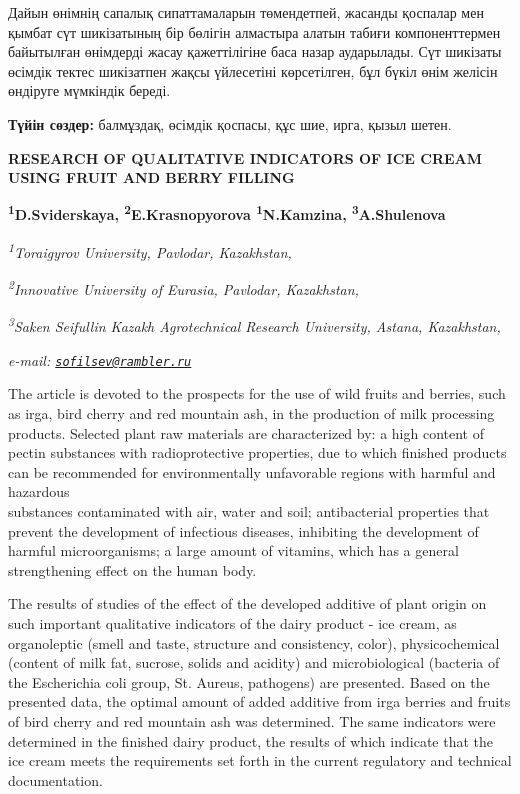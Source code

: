 Дайын өнімнің сапалық сипаттамаларын төмендетпей, жасанды қоспалар мен
қымбат сүт шикізатының бір бөлігін алмастыра алатын табиғи
компоненттермен байытылған өнімдерді жасау қажеттілігіне баса назар
аударылады. Сүт шикізаты өсімдік тектес шикізатпен жақсы үйлесетіні
көрсетілген, бұл бүкіл өнім желісін өндіруге мүмкіндік береді.

{\bfseries Түйін сөздер:} балмұздақ, өсімдік қоспасы, құс шие, ирга, қызыл
шетен.

\begin{articleheader}
{\bfseries RESEARCH OF QUALITATIVE INDICATORS OF ICE CREAM USING FRUIT AND BERRY FILLING}

{\bfseries
\textsuperscript{1}D.Sviderskaya\textsuperscript{\envelope },
\textsuperscript{2}E.Krasnopyorova
\textsuperscript{1}N.Kamzina,
\textsuperscript{3}A.Shulenova}
\end{articleheader}

\begin{affiliation}
\emph{\textsuperscript{1}Toraigyrov University, Pavlodar, Kazakhstan,}

\emph{\textsuperscript{2}Innovative University of Eurasia, Pavlodar, Kazakhstan,}

\emph{\textsuperscript{3}Saken Seifullin Kazakh Agrotechnical Research University, Astana, Kazakhstan,}

\emph{e-mail: \href{mailto:sofilsev@rambler.ru}{\nolinkurl{sofilsev@rambler.ru}}}
\end{affiliation}

The article is devoted to the prospects for the use of wild fruits and
berries, such as irga, bird cherry and red mountain ash, in the
production of milk processing products. Selected plant raw materials are
characterized by: a high content of pectin substances with
radioprotective properties, due to which finished products can be
recommended for environmentally unfavorable regions with harmful and
hazardous \\substances contaminated with air, water and soil;
antibacterial properties that prevent the development of infectious
diseases, inhibiting the development of harmful microorganisms; a large
amount of vitamins, which has a general strengthening effect on the
human body.

The results of studies of the effect of the developed additive of plant
origin on such important qualitative indicators of the dairy product -
ice cream, as organoleptic (smell and taste, structure and consistency,
color), physicochemical (content of milk fat, sucrose, solids and
acidity) and microbiological (bacteria of the Escherichia coli group,
St. Aureus, pathogens) are presented. Based on the presented data, the
optimal amount of added additive from irga berries and fruits of bird
cherry and red mountain ash was determined. The same indicators were
determined in the finished dairy product, the results of which indicate
that the ice cream meets the requirements set forth in the current
regulatory and technical documentation.

